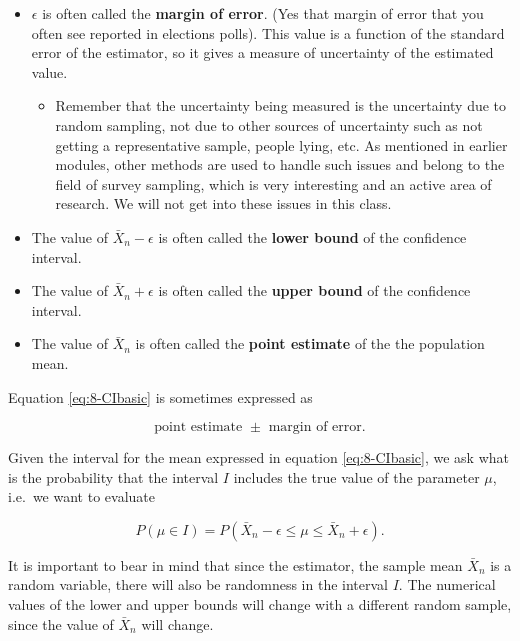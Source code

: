 \documentclass[
]{book}
\providecommand{\tightlist}{%
  \setlength{\itemsep}{0pt}\setlength{\parskip}{0pt}}
\begin{document}
\begin{itemize}
\item
  \(\epsilon\) is often called the \textbf{margin of error}. (Yes that margin of error that you often see reported in elections polls). This value is a function of the standard error of the estimator, so it gives a measure of uncertainty of the estimated value.

  \begin{itemize}
  \tightlist
  \item
    Remember that the uncertainty being measured is the uncertainty due to random sampling, not due to other sources of uncertainty such as not getting a representative sample, people lying, etc. As mentioned in earlier modules, other methods are used to handle such issues and belong to the field of survey sampling, which is very interesting and an active area of research. We will not get into these issues in this class.
  \end{itemize}
\item
  The value of \(\bar{X}_n - \epsilon\) is often called the \textbf{lower bound} of the confidence interval.
\item
  The value of \(\bar{X}_n + \epsilon\) is often called the \textbf{upper bound} of the confidence interval.
\item
  The value of \(\bar{X}_n\) is often called the \textbf{point estimate} of the the population mean.
\end{itemize}

Equation \eqref{eq:8-CIbasic} is sometimes expressed as

\begin{equation} 
\text{point estimate } \pm \text{ margin of error}.
\label{eq:8-CIbasic2}
\end{equation}

Given the interval for the mean expressed in equation \eqref{eq:8-CIbasic}, we ask what is the probability that the interval \(I\) includes the true value of the parameter \(\mu\), i.e.~we want to evaluate

\begin{equation} 
P(\mu \in  I) = P(\bar{X}_n - \epsilon \leq \mu \leq \bar{X}_n + \epsilon).
\label{eq:8-CIprob}
\end{equation}

It is important to bear in mind that since the estimator, the sample mean \(\bar{X}_n\) is a random variable, there will also be randomness in the interval \(I\). The numerical values of the lower and upper bounds will change with a different random sample, since the value of \(\bar{X}_n\) will change.
\end{document}
